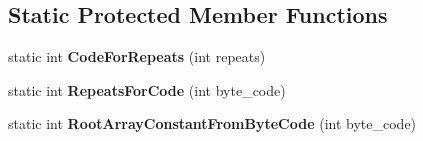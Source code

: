 \subsection*{Static Protected Member Functions}
\begin{DoxyCompactItemize}
\item 
\hypertarget{classv8_1_1internal_1_1_serializer_deserializer_aa06d4ec4830bd01af277101b3f4df693}{}static int {\bfseries Code\+For\+Repeats} (int repeats)\label{classv8_1_1internal_1_1_serializer_deserializer_aa06d4ec4830bd01af277101b3f4df693}

\item 
\hypertarget{classv8_1_1internal_1_1_serializer_deserializer_a53890bf065b11a1685940adc1aff9fa5}{}static int {\bfseries Repeats\+For\+Code} (int byte\+\_\+code)\label{classv8_1_1internal_1_1_serializer_deserializer_a53890bf065b11a1685940adc1aff9fa5}

\item 
\hypertarget{classv8_1_1internal_1_1_serializer_deserializer_a4d27af5bb59ddd616e9e4682f3b4a3e3}{}static int {\bfseries Root\+Array\+Constant\+From\+Byte\+Code} (int byte\+\_\+code)\label{classv8_1_1internal_1_1_serializer_deserializer_a4d27af5bb59ddd616e9e4682f3b4a3e3}

\end{DoxyCompactItemize}
